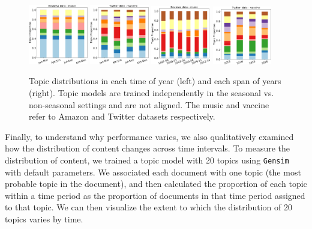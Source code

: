 \begin{figure}
\centering
\includegraphics[width=0.23\textwidth]{images/chapter3/acl2018/topic_amazon_month.pdf}
\includegraphics[width=0.23\textwidth]{images/chapter3/acl2018/topic_vaccine_month.pdf} 
\quad
\includegraphics[width=0.23\textwidth]{images/chapter3/acl2018/topic_amazon_year.pdf}
\includegraphics[width=0.23\textwidth]{images/chapter3/acl2018/topic_vaccine_year.pdf}
\caption{\label{chap3:fig:topic} Topic distributions in each time of year (left) and each span of years (right). Topic models are trained independently in the seasonal vs. non-seasonal settings and are not aligned. The music and vaccine refer to Amazon and Twitter datasets respectively.}
\end{figure}

Finally, to understand why performance varies, we also qualitatively examined how the distribution of content changes across time intervals.
To measure the distribution of content, we trained a topic model with 20 topics using \texttt{Gensim}~\cite{rehurek2010software} with default parameters.
We associated each document with one topic (the most probable topic in the document), and then calculated the proportion of each topic within a time period as the proportion of documents in that time period assigned to that topic.
We can then visualize the extent to which the distribution of 20 topics varies by time.

